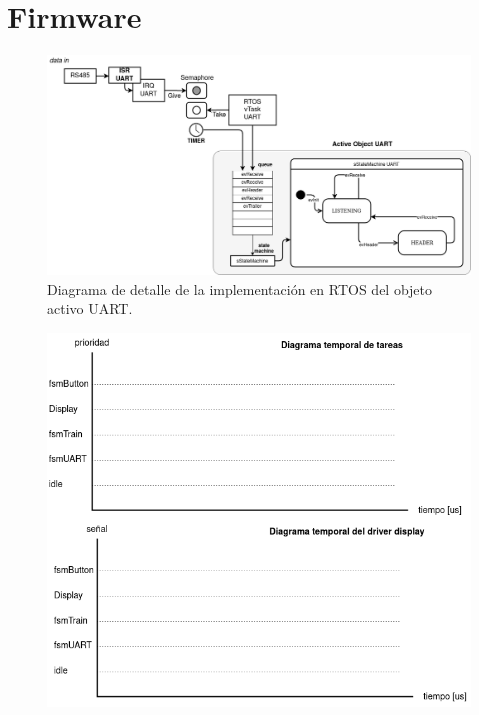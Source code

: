 \pagebreak
\section{Firmware}


\begin{figure}[ht]
	\centering
	\includegraphics[width=1\textwidth]{./Figures/fsmUART.png}
	\caption{Diagrama de detalle de la implementación en RTOS del objeto activo UART.}
	\label{fig:fsmUART}
\end{figure}


\begin{figure}[ht]
	\centering
	\includegraphics[width=1\textwidth]{./Figures/diagramasTemporales.png}
	\caption{}
	\label{fig:diagramasTemporales}
\end{figure}

\pagebreak
